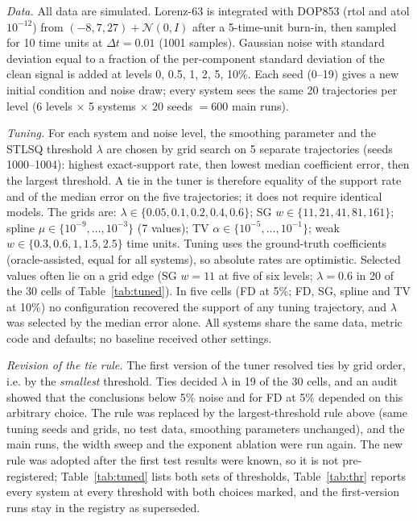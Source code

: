 \textit{Data.} All data are simulated. Lorenz-63 is integrated with DOP853 (rtol and atol $10^{-12}$) from $(-8,7,27)+\mathcal{N}(0,I)$ after a 5-time-unit burn-in, then sampled for 10 time units at $\Delta t=0.01$ (1001 samples). Gaussian noise with standard deviation equal to a fraction of the per-component standard deviation of the clean signal is added at levels 0, 0.5, 1, 2, 5, 10\%. Each seed (0--19) gives a new initial condition and noise draw; every system sees the same 20 trajectories per level (6 levels $\times$ 5 systems $\times$ 20 seeds $=600$ main runs).

\textit{Tuning.} For each system and noise level, the smoothing parameter and the STLSQ threshold $\lambda$ are chosen by grid search on 5 separate trajectories (seeds 1000--1004): highest exact-support rate, then lowest median coefficient error, then the largest threshold. A tie in the tuner is therefore equality of the support rate and of the median error on the five trajectories; it does not require identical models. The grids are: $\lambda\in\{0.05,0.1,0.2,0.4,0.6\}$; SG $w\in\{11,21,41,81,161\}$; spline $\mu\in\{10^{-9},\dots,10^{-3}\}$ (7 values); TV $\alpha\in\{10^{-5},\dots,10^{-1}\}$; weak $w\in\{0.3,0.6,1,1.5,2.5\}$ time units. Tuning uses the ground-truth coefficients (oracle-assisted, equal for all systems), so absolute rates are optimistic. Selected values often lie on a grid edge (SG $w=11$ at five of six levels; $\lambda=0.6$ in 20 of the 30 cells of Table~\ref{tab:tuned}). In five cells (FD at 5\%; FD, SG, spline and TV at 10\%) no configuration recovered the support of any tuning trajectory, and $\lambda$ was selected by the median error alone. All systems share the same data, metric code and defaults; no baseline received other settings.

\textit{Revision of the tie rule.} The first version of the tuner resolved ties by grid order, i.e. by the \emph{smallest} threshold. Ties decided $\lambda$ in 19 of the 30 cells, and an audit showed that the conclusions below 5\% noise and for FD at 5\% depended on this arbitrary choice. The rule was replaced by the largest-threshold rule above (same tuning seeds and grids, no test data, smoothing parameters unchanged), and the main runs, the width sweep and the exponent ablation were run again. The new rule was adopted after the first test results were known, so it is not pre-registered; Table~\ref{tab:tuned} lists both sets of thresholds, Table~\ref{tab:thr} reports every system at every threshold with both choices marked, and the first-version runs stay in the registry as superseded.

